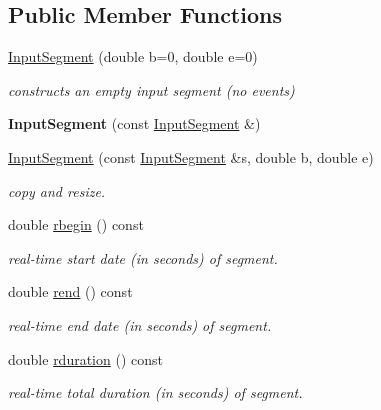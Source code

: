 \subsection*{Public Member Functions}
\begin{DoxyCompactItemize}
\item 
\mbox{\hyperlink{group__segment_gaec471ec05052a932b1bb2738bfc8b172}{Input\+Segment}} (double b=0, double e=0)
\begin{DoxyCompactList}\small\item\em constructs an empty input segment (no events) \end{DoxyCompactList}\item 
{\bfseries Input\+Segment} (const \mbox{\hyperlink{classInputSegment}{Input\+Segment}} \&)
\item 
\mbox{\hyperlink{group__segment_ga58d6af0b8186068f4bc26f58e6e62eef}{Input\+Segment}} (const \mbox{\hyperlink{classInputSegment}{Input\+Segment}} \&s, double b, double e)
\begin{DoxyCompactList}\small\item\em copy and resize. \end{DoxyCompactList}\item 
\mbox{\label{classInputSegment_a78b3f9b3b422ee5f92ba14056a76ccff}} 
double \mbox{\hyperlink{classInputSegment_a78b3f9b3b422ee5f92ba14056a76ccff}{rbegin}} () const
\begin{DoxyCompactList}\small\item\em real-\/time start date (in seconds) of segment. \end{DoxyCompactList}\item 
\mbox{\label{classInputSegment_ad81105da6beb534a48a59d9219476732}} 
double \mbox{\hyperlink{classInputSegment_ad81105da6beb534a48a59d9219476732}{rend}} () const
\begin{DoxyCompactList}\small\item\em real-\/time end date (in seconds) of segment. \end{DoxyCompactList}\item 
\mbox{\label{classInputSegment_a590310d241cec28ac9b03b6a6708489b}} 
double \mbox{\hyperlink{classInputSegment_a590310d241cec28ac9b03b6a6708489b}{rduration}} () const
\begin{DoxyCompactList}\small\item\em real-\/time total duration (in seconds) of segment. \end{DoxyCompactList}\item 

\end{DoxyCompactItemize}
